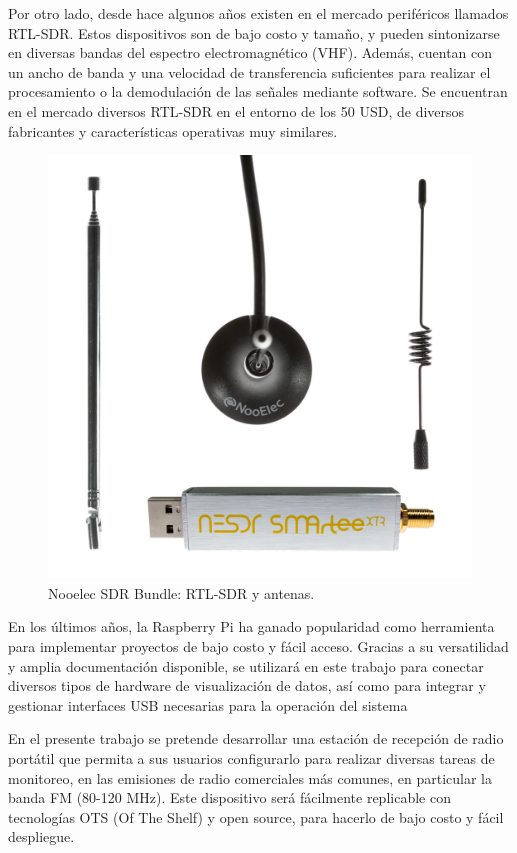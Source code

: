 \documentclass[
11pt, %
codirector, %
]{charter}
\begin{document}
Por otro lado, desde hace algunos años existen en el mercado periféricos llamados RTL-SDR. Estos dispositivos son de bajo costo y tamaño, y pueden sintonizarse en diversas bandas del espectro electromagnético (VHF). Además, cuentan con un ancho de banda y una velocidad de transferencia suficientes para realizar el procesamiento o la demodulación de las señales mediante software. Se encuentran en el mercado diversos RTL-SDR en el entorno de los 50 USD, de diversos fabricantes y características operativas muy similares.

\begin{figure}[H]
\centering 
\includegraphics[width=.65\textwidth]{./Figuras/RTL-SDR.png} 
\caption{Nooelec SDR Bundle: RTL-SDR y antenas.}
\label{fig:diagBloques}
\end{figure}

En los últimos años, la Raspberry Pi ha ganado popularidad como herramienta para implementar proyectos de bajo costo y fácil acceso. Gracias a su versatilidad y amplia documentación disponible, se utilizará en este trabajo para conectar diversos tipos de hardware de visualización de datos, así como para integrar y gestionar interfaces USB necesarias para la operación del sistema

En el presente trabajo se pretende desarrollar una estación de recepción de radio portátil que permita a sus usuarios configurarlo para realizar diversas tareas de monitoreo, en las emisiones de radio comerciales más comunes, en particular la banda FM (80-120 MHz). Este dispositivo será fácilmente replicable con tecnologías OTS (Of The Shelf) y open source, para hacerlo de bajo costo y fácil despliegue. 
\end{document}
